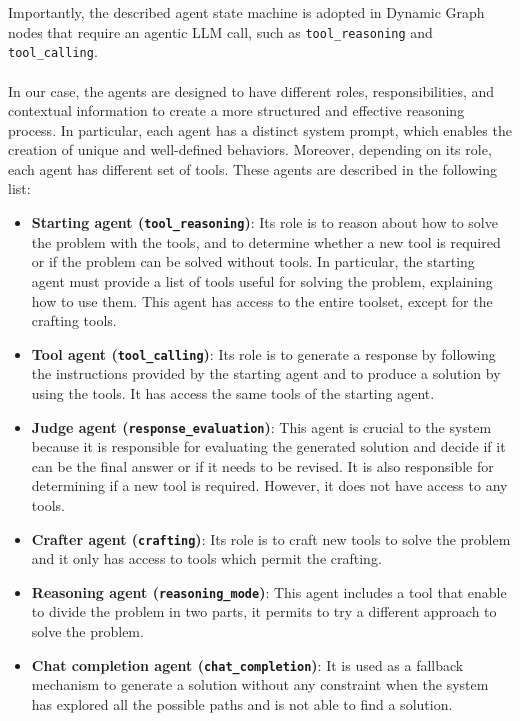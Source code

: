 \documentclass[12pt,a4paper,openright,twoside]{book}
\begin{document}
Importantly, the described agent state machine is adopted in Dynamic Graph nodes that require an agentic \ac{LLM} call, such as \texttt{tool\_reasoning} and \texttt{tool\_calling}.
\\
\\
In our case, the agents are designed to have different roles, responsibilities, and contextual information to create a more structured and effective reasoning process.
In particular, each agent has a distinct system prompt, which enables the creation of unique and well-defined behaviors. 
Moreover, depending on its role, each agent has different set of tools. 
These agents are described in the following list:
\begin{itemize}
    \item \textbf{Starting agent (\texttt{tool\_reasoning})}: Its role is to reason about how to solve the problem with the tools, and to determine whether a new tool is required or if the problem can be solved without tools. In particular, the starting agent must provide a list of tools useful for solving the problem, explaining how to use them. This agent has access to the entire toolset, except for the crafting tools.   
    \item \textbf{Tool agent (\texttt{tool\_calling})}: Its role is to generate a response by following the instructions provided by the starting agent and to produce a solution by using the tools. It has access the same tools of the starting agent.
    \item \textbf{Judge agent (\texttt{response\_evaluation})}: This agent is crucial to the system because it is responsible for evaluating the generated solution and decide if it can be the final answer or if it needs to be revised. It is also responsible for determining if a new tool is required. However, it does not have access to any tools.
    \item \textbf{Crafter agent (\texttt{crafting})}: Its role is to craft new tools to solve the problem and it only has access to tools which permit the crafting.
    \item \textbf{Reasoning agent (\texttt{reasoning\_mode})}: This agent includes a tool that enable to divide the problem in two parts, it permits to try a different approach to solve the problem. 
    \item \textbf{Chat completion agent (\texttt{chat\_completion})}: It is used as a fallback mechanism to generate a solution without any constraint when the system has explored all the possible paths and is not able to find a solution.
\end{itemize}
\end{document}

